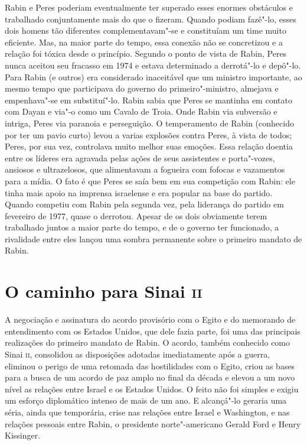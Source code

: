 Rabin e Peres poderiam eventualmente ter superado esses enormes
obstáculos e trabalhado conjuntamente mais do que o fizeram. Quando
podiam fazê"-lo, esses dois homens tão diferentes complementavam"-se e
constituíam um time muito eficiente. Mas, na maior parte do tempo, essa
conexão não se concretizou e a relação foi tóxica desde o princípio.
Segundo o ponto de vista de Rabin, Peres nunca aceitou seu fracasso em
1974 e estava determinado a derrotá"-lo e depô"-lo. Para Rabin (e outros)
era considerado inaceitável que um ministro importante, ao mesmo tempo
que participava do governo do primeiro"-ministro, almejava e empenhava"-se
em substituí"-lo. Rabin sabia que Peres se mantinha em contato com Dayan
e via"-o como um Cavalo de Troia. Onde Rabin via subversão e intriga,
Peres via paranoia e perseguição. O temperamento de Rabin (conhecido por
ter um pavio curto) levou a varias explosões contra Peres, à vista de
todos; Peres, por sua vez, controlava muito melhor suas emoções. Essa
relação doentia entre os líderes era agravada pelas ações de seus
assistentes e porta"-vozes, ansiosos e ultrazelosos, que alimentavam a
fogueira com fofocas e vazamentos para a mídia. O fato é que Peres se
saía bem em sua competição com Rabin: ele tinha mais apoio na imprensa
israelense e era popular na base do partido. Quando competiu com Rabin
pela segunda vez, pela liderança do partido em fevereiro de 1977, quase
o derrotou. Apesar de os dois obviamente terem trabalhado juntos a maior
parte do tempo, e de o governo ter funcionado, a rivalidade entre eles
lançou uma sombra permanente sobre o primeiro mandato de Rabin.

\section{O caminho para Sinai \textsc{ii}}

A negociação e assinatura do acordo provisório com o Egito e do
memorando de entendimento com os Estados Unidos, que dele fazia parte,
foi uma das principais realizações do primeiro mandato de Rabin. O
acordo, também conhecido como Sinai \textsc{ii}, consolidou as disposições
adotadas imediatamente após a guerra, eliminou o perigo de uma retomada
das hostilidades com o Egito, criou as bases para a busca de um acordo
de paz amplo no final da década e elevou a um novo nível as relações
entre Israel e os Estados Unidos. O feito não foi simples e exigiu um
esforço diplomático intenso de mais de um ano. E alcançá"-lo geraria uma
séria, ainda que temporária, crise nas relações entre Israel e
Washington, e nas relações pessoais entre Rabin, o presidente norte"-americano Gerald Ford e Henry Kissinger.

